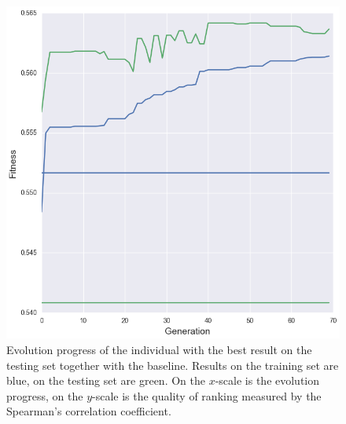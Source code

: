 \begin{figure}	
	\includegraphics[width=14cm]{Images/bestTrainingCombined.png}
	\centering
	\caption{Evolution progress of the individual with the best result on the testing set together with the baseline. Results on the training set are blue, on the testing set are green. On the $x$-scale is the evolution progress, on the $y$-scale is the quality of ranking measured by the Spearman's correlation coefficient.}	
	\label{fig:bestTrainingCombined}	
\end{figure} 
 
